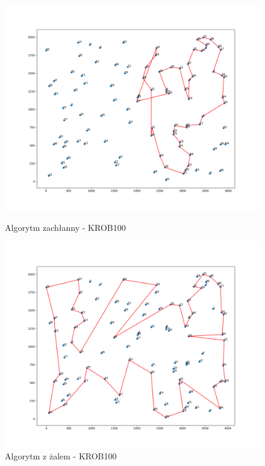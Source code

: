 \documentclass{article}
\begin{document}
  \begin{figure}[h!]
    \centering
      \begin{minipage}[b]{0.8\textwidth}
        \includegraphics[width=\textwidth]{krob_greedy.png}
        \caption{Algorytm zachłanny - KROB100}
      \end{minipage}
    
      \begin{minipage}[b]{0.8\textwidth}
        \includegraphics[width=\textwidth]{krob_min_regret_19830.png}
        \caption{Algorytm z żalem - KROB100}
      \end{minipage}  
\end{figure}
\end{document}
